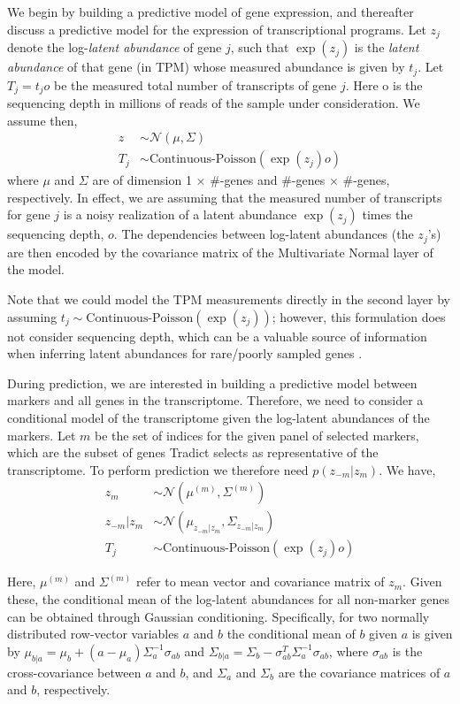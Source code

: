 \documentclass[10pt]{article}
\begin{document}
We begin by building a predictive model of gene expression, and thereafter discuss a predictive model for the expression of transcriptional programs. Let $z_j$ denote the log-\emph{latent abundance} of gene $j$, such that $\exp(z_j)$ is the \emph{latent abundance} of that gene (in TPM) whose measured abundance is given by $t_j$. Let $T_j = t_jo$ be the measured total number of transcripts of gene $j$. Here o is the sequencing depth in millions of reads of the sample under consideration. We assume then, 
\begin{align*}
z & \sim \mathcal{N}\left(\mu, \Sigma\right) \\
T_j & \sim \textrm{Continuous-Poisson}(\exp(z_j)o)
\end{align*}
where $\mu$ and $\Sigma$ are of dimension 1 $\times$ $\#$-genes and $\#$-genes $\times$ $\#$-genes, respectively. In effect, we are assuming that the measured number of transcripts for gene $j$ is a noisy realization of a latent abundance $\exp(z_j)$ times the sequencing depth, $o$. The dependencies between log-latent abundances (the $z_j$'s) are then encoded by the covariance matrix of the Multivariate Normal layer of the model. 


Note that we could model the TPM measurements directly in the second layer by assuming $t_j \sim \textrm{Continuous-Poisson}(\exp(z_j))$; however, this formulation does not consider sequencing depth, which can be a valuable source of information when inferring latent abundances for rare/poorly sampled genes \cite{Biswas2016a}. 

During prediction, we are interested in building a predictive model between markers and all genes in the transcriptome. Therefore, we need to consider a conditional model of the transcriptome given the log-latent abundances of the markers. Let $m$ be the set of indices for the given panel of selected markers, which are the subset of genes Tradict selects as representative of the transcriptome. To perform prediction we therefore need $p(z_{-m} | z_m)$.  We have, 
\begin{align*}
z_m & \sim \mathcal{N}(\mu^{(m)}, \Sigma^{(m)}) \\
z_{-m}|z_m & \sim \mathcal{N}(\mu_{z_{-m}|z_m}, \Sigma_{z_{-m}|z_m}) \\
T_j & \sim \textrm{Continuous-Poisson}(\exp(z_j)o)
\end{align*}

Here, $\mu^{(m)}$ and $\Sigma^{(m)}$ refer to mean vector and covariance matrix of $z_m$. Given these, the conditional mean of the log-latent abundances for all non-marker genes can be obtained through Gaussian conditioning. Specifically, for two normally distributed row-vector variables $a$ and $b$ the conditional mean of $b$ given $a$ is given by $\mu_{b|a} = \mu_b + (a - \mu_a)\Sigma_{a}^{-1}\sigma_{ab}$ and $\Sigma_{b|a} = \Sigma_{b} - \sigma_{ab}^T\Sigma_a^{-1}\sigma_{ab}$, where $\sigma_{ab}$ is the cross-covariance between $a$ and $b$, and $\Sigma_a$ and $\Sigma_b$ are the covariance matrices of $a$ and $b$, respectively.
\end{document}
